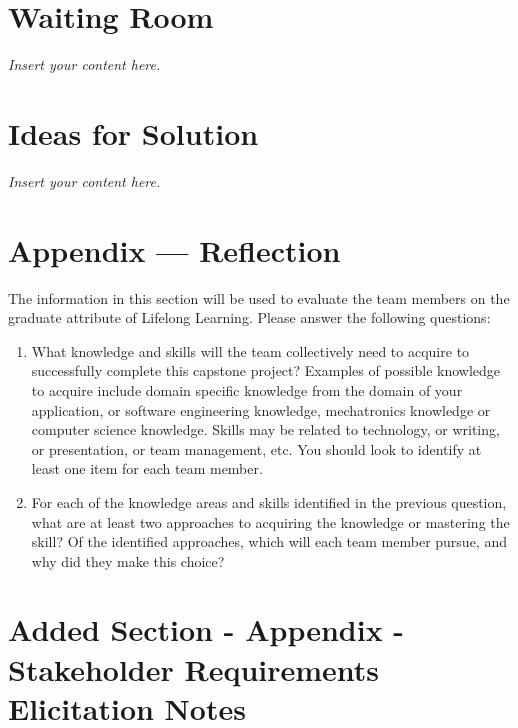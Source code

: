 \documentclass[12pt]{article}
\newcommand{\lips}{\textit{Insert your content here.}}
\begin{document}
\section{Waiting Room}
\lips

\section{Ideas for Solution}
\lips

\newpage{}
\section*{Appendix --- Reflection}

The information in this section will be used to evaluate the team members on the
graduate attribute of Lifelong Learning.  Please answer the following questions:

\begin{enumerate}
  \item What knowledge and skills will the team collectively need to acquire to
  successfully complete this capstone project?  Examples of possible knowledge
  to acquire include domain specific knowledge from the domain of your
  application, or software engineering knowledge, mechatronics knowledge or
  computer science knowledge.  Skills may be related to technology, or writing,
  or presentation, or team management, etc.  You should look to identify at
  least one item for each team member.
  \item For each of the knowledge areas and skills identified in the previous
  question, what are at least two approaches to acquiring the knowledge or
  mastering the skill?  Of the identified approaches, which will each team
  member pursue, and why did they make this choice?
\end{enumerate}

\section*{Added Section - Appendix - Stakeholder Requirements Elicitation Notes}
\end{document}
